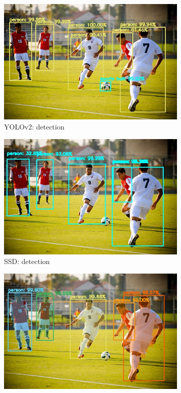 \begin{figure}[!h]
	\centering
	\begin{subfigure}{.45\linewidth}
		\includegraphics[width=\linewidth]{images/detection/ex3_yolo}
		\caption{YOLOv2: detection}
	\end{subfigure}
	\begin{subfigure}{.45\linewidth}
		\includegraphics[width=\linewidth]{images/detection/ex3_ssd}
		\caption{SSD: detection}
	\end{subfigure}
	\begin{subfigure}{.45\linewidth}
		\includegraphics[width=\linewidth]{images/detection/ex3_mask-rcnn}

\end{subfigure}
\end{figure}
